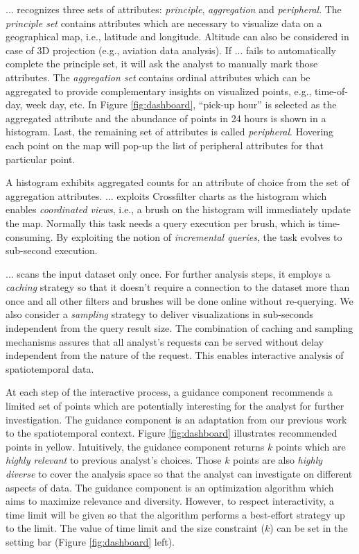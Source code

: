 \documentclass[runningheads,a4paper]{llncs}
\begin{document}
... recognizes three sets of attributes: {\em principle}, {\em aggregation} and {\em peripheral}. The {\em principle set} contains attributes which are necessary to visualize data on a geographical map, i.e., latitude and longitude. Altitude can also be considered in case of 3D projection (e.g., aviation data analysis). If ... fails to automatically complete the principle set, it will ask the analyst to manually mark those attributes. The {\em aggregation set} contains ordinal attributes which can be aggregated to provide complementary insights on visualized points, e.g., time-of-day, week day, etc. In Figure \ref{fig:dashboard}, ``pick-up hour'' is selected as the aggregated attribute and the abundance of points in 24 hours is shown in a histogram. Last, the remaining set of attributes is called {\em peripheral}. Hovering each point on the map will pop-up the list of peripheral attributes for that particular point.

A histogram exhibits aggregated counts for an attribute of choice from the set of aggregation attributes. ... exploits Crossfilter charts \cite{cf} as the histogram which enables {\em coordinated views}, i.e., a brush on the histogram will immediately update the map. Normally this task needs a query execution per brush, which is time-consuming. By exploiting the notion of {\em incremental queries}, the task evolves to sub-second execution.

... scans the input dataset only once. For further analysis steps, it employs a {\em caching} strategy so that it doesn't require a connection to the dataset more than once and all other filters and brushes will be done online without re-querying. We also consider a {\em sampling} strategy to deliver visualizations in sub-seconds independent from the query result size. The combination of caching and sampling mechanisms assures that all analyst's requests can be served without delay independent from the nature of the request. This enables interactive analysis of spatiotemporal data.

At each step of the interactive process, a guidance component recommends a limited set of points which are potentially interesting for the analyst for further investigation. The guidance component is an adaptation from our previous work~\cite{Omidvar-Tehrani:2015} to the spatiotemporal context. Figure \ref{fig:dashboard} illustrates recommended points in yellow. Intuitively, the guidance component returns $k$ points which are {\em highly relevant} to previous analyst's choices. Those $k$ points are also {\em highly diverse} to cover the analysis space so that the analyst can investigate on different aspects of data. The guidance component is an optimization algorithm which aims to maximize relevance and diversity. However, to respect interactivity, a time limit will be given so that the algorithm performs a best-effort strategy up to the limit. The value of time limit and the size constraint ($k$) can be set in the setting bar (Figure \ref{fig:dashboard} left).
\end{document}
